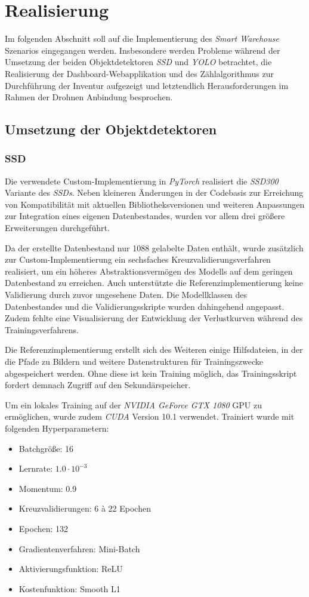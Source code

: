 \chapter{Realisierung}
\label{realisierung}

Im folgenden Abschnitt soll auf die Implementierung des \textit{Smart Warehouse} Szenarios eingegangen werden. Insbesondere werden Probleme während der Umsetzung der beiden Objektdetektoren \textit{SSD} und \textit{YOLO} betrachtet, die Realisierung der Dashboard-Webapplikation und des Zählalgorithmus zur Durchführung der Inventur aufgezeigt und letztendlich Herausforderungen im Rahmen der Drohnen Anbindung besprochen.

\section{Umsetzung der Objektdetektoren}

\subsection*{SSD}

Die verwendete Custom-Implementierung in \textit{PyTorch} realisiert die \textit{SSD300} Variante des \textit{SSDs}. Neben kleineren Änderungen in der Codebasis zur Erreichung von Kompatibilität mit aktuellen Bibliotheksversionen und weiteren Anpassungen zur Integration eines eigenen Datenbestandes, wurden vor allem drei größere Erweiterungen durchgeführt. 

Da der erstellte Datenbestand nur 1088 gelabelte Daten enthält, wurde zusätzlich zur Custom-Implementierung ein sechsfaches Kreuzvalidierungsverfahren realisiert, um ein höheres Abstraktionsvermögen des Modells auf dem geringen Datenbestand zu erreichen. Auch unterstützte die Referenzimplementierung keine Validierung durch zuvor ungesehene Daten. Die Modellklassen des Datenbestandes und die Validierungsskripte wurden dahingehend angepasst. Zudem fehlte eine Visualisierung der Entwicklung der Verlustkurven während des Trainingsverfahrens.

Die Referenzimplementierung erstellt sich des Weiteren einige Hilfsdateien, in der die Pfade zu Bildern und weitere Datenstrukturen für Trainingszwecke abgespeichert werden. Ohne diese ist kein Training möglich, das Trainingsskript fordert demnach Zugriff auf den Sekundärspeicher. 

Um ein lokales Training auf der \textit{NVIDIA GeForce GTX 1080} GPU zu ermöglichen, wurde zudem \textit{CUDA} Version 10.1 verwendet. Trainiert wurde mit folgenden Hyperparametern:
\begin{itemize}
	\item Batchgröße: 16
	\item Lernrate: $1.0\cdot 10^{-3}$
	\item Momentum: 0.9
	\item Kreuzvalidierungen: 6 à 22 Epochen
	\item Epochen: 132
	\item Gradientenverfahren: Mini-Batch
	\item Aktivierungsfunktion: ReLU
	\item Kostenfunktion: Smooth L1
\end{itemize}

